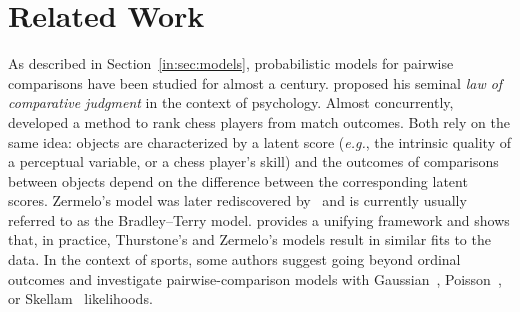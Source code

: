 \section{Related Work}
\label{kks:sec:relwork}

As described in Section~\ref{in:sec:models}, probabilistic models for pairwise comparisons have been studied for almost a century.
\citet{thurstone1927law} proposed his seminal \emph{law of comparative judgment} in the context of psychology.
Almost concurrently,~\citet{zermelo1928berechnung} developed a method to rank chess players from match outcomes.
Both rely on the same idea: objects are characterized by a latent score (\textit{e.g.}, the intrinsic quality of a perceptual variable, or a chess player's skill) and the outcomes of comparisons between objects depend on the difference between the corresponding latent scores.
Zermelo's model was later rediscovered by~\citet{bradley1952rank} and is currently usually referred to as the Bradley--Terry model.
\citet{stern1992all} provides a unifying framework and shows that, in practice, Thurstone's and Zermelo's models result in similar fits to the data.
In the context of sports, some authors suggest going beyond ordinal outcomes and investigate pairwise-comparison models with Gaussian~\citep{guo2012score}, Poisson~\citep{maher1982modelling, guo2012score}, or Skellam~\citep{karlis2009bayesian} likelihoods.

